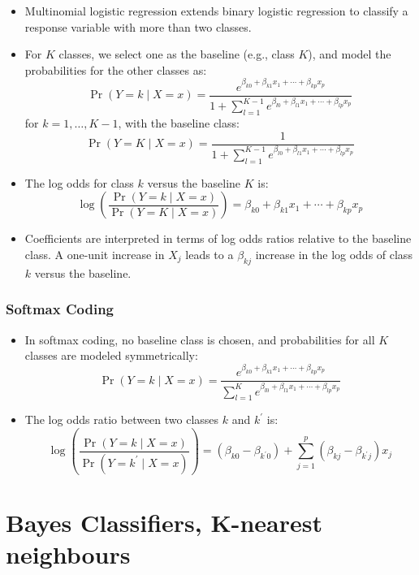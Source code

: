 \documentclass{article}
\begin{document}
\begin{itemize}
    \item Multinomial logistic regression extends binary logistic regression to classify a response variable with more than two classes.
    \item For $K$ classes, we select one as the baseline (e.g., class $K$), and model the probabilities for the other classes as:
    \[
    \operatorname{Pr}(Y=k \mid X=x)=\frac{e^{\beta_{k0}+\beta_{k1} x_1 + \cdots + \beta_{kp} x_p}}{1 + \sum_{l=1}^{K-1} e^{\beta_{l0} + \beta_{l1} x_1 + \cdots + \beta_{lp} x_p}}
    \]
    for $k = 1, \ldots, K-1$, with the baseline class:
    \[
    \operatorname{Pr}(Y=K \mid X=x)=\frac{1}{1 + \sum_{l=1}^{K-1} e^{\beta_{l0} + \beta_{l1} x_1 + \cdots + \beta_{lp} x_p}}
    \]
    \item The log odds for class $k$ versus the baseline $K$ is:
    \[
    \log \left(\frac{\operatorname{Pr}(Y=k \mid X=x)}{\operatorname{Pr}(Y=K \mid X=x)}\right) = \beta_{k0} + \beta_{k1} x_1 + \cdots + \beta_{kp} x_p
    \]
    \item Coefficients are interpreted in terms of log odds ratios relative to the baseline class. A one-unit increase in $X_j$ leads to a $\beta_{kj}$ increase in the log odds of class $k$ versus the baseline.
\end{itemize}

\subsubsection{Softmax Coding}

\begin{itemize}
    \item In softmax coding, no baseline class is chosen, and probabilities for all $K$ classes are modeled symmetrically:
    \[
    \operatorname{Pr}(Y=k \mid X=x)=\frac{e^{\beta_{k0}+\beta_{k1} x_1 + \cdots + \beta_{kp} x_p}}{\sum_{l=1}^{K} e^{\beta_{l0} + \beta_{l1} x_1 + \cdots + \beta_{lp} x_p}}
    \]
    \item The log odds ratio between two classes $k$ and $k^{\prime}$ is:
    \[
    \log \left(\frac{\operatorname{Pr}(Y=k \mid X=x)}{\operatorname{Pr}(Y=k^{\prime} \mid X=x)}\right) = (\beta_{k0} - \beta_{k^{\prime}0}) + \sum_{j=1}^{p} (\beta_{kj} - \beta_{k^{\prime}j}) x_j
    \]
\end{itemize}

\section{Bayes Classifiers, K-nearest neighbours}
\end{document}
